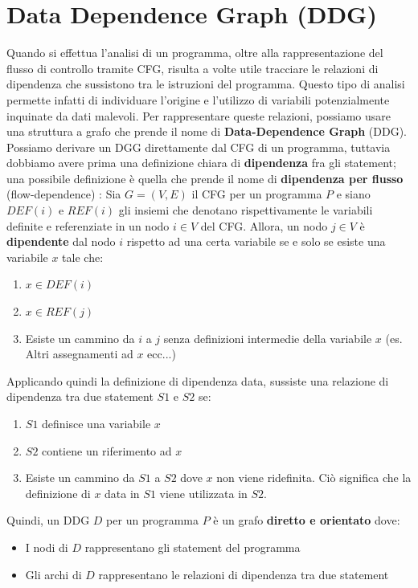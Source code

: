 \documentclass[../main.tex]{subfiles}
\begin{document}
\section{Data Dependence Graph (DDG)}
Quando si effettua l'analisi di un programma, oltre alla rappresentazione del flusso di controllo tramite CFG, risulta a volte utile tracciare le relazioni di dipendenza che sussistono tra le istruzioni del programma.
Questo tipo di analisi permette infatti di individuare l'origine e l'utilizzo di variabili potenzialmente inquinate da dati malevoli. Per rappresentare queste relazioni, possiamo usare una struttura a grafo che prende il nome
di \textbf{Data-Dependence Graph} (DDG). Possiamo derivare un DGG direttamente dal CFG di un programma, tuttavia dobbiamo avere prima una definizione chiara di \textbf{dipendenza} fra gli statement; una possibile definizione è quella che prende il nome di \textbf{dipendenza per flusso} (flow-dependence) \cite{DDG}:
Sia $G = (V, E)$ il CFG per un programma $P$ e siano $DEF(i)$ e $REF(i)$ gli insiemi che denotano rispettivamente le variabili definite e referenziate in un nodo $i \in V$ del CFG.
Allora, un nodo $j \in V$ è \textbf{dipendente} dal nodo $i$ rispetto ad una certa variabile se e solo se esiste una variabile $x$ tale che:
\begin{enumerate}
    \item $x \in DEF(i)$
    \item $x \in REF(j)$
    \item Esiste un cammino da $i$ a $j$ senza definizioni intermedie della variabile $x$ (es. Altri assegnamenti ad $x$ ecc...)
\end{enumerate} 
Applicando quindi la definizione di dipendenza data, sussiste una relazione di dipendenza tra due statement $S1$ e $S2$ se:
\begin{enumerate}
    \item $S1$ definisce una variabile $x$
    \item $S2$ contiene un riferimento ad $x$
    \item Esiste un cammino da $S1$ a $S2$ dove $x$ non viene ridefinita. Ciò significa che la definizione di $x$ data in $S1$ viene utilizzata in $S2$.  
\end{enumerate}
Quindi, un DDG $D$ per un programma $P$ è un grafo \textbf{diretto e orientato} dove:
\begin{itemize}
    \item I nodi di $D$ rappresentano gli statement del programma
    \item Gli archi di $D$ rappresentano le relazioni di dipendenza tra due statement
\end{itemize}
\end{document}
